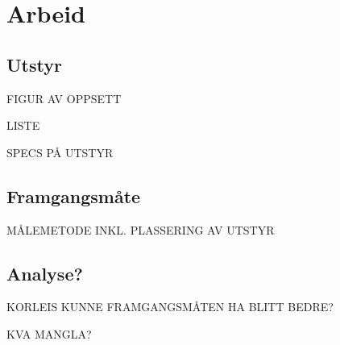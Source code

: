 \section{Arbeid}
\subsection{Utstyr}
FIGUR AV OPPSETT

LISTE

SPECS PÅ UTSTYR
\subsection{Framgangsmåte}
MÅLEMETODE INKL. PLASSERING AV UTSTYR

\subsection{Analyse?}
KORLEIS KUNNE FRAMGANGSMÅTEN HA BLITT BEDRE?

KVA MANGLA?
